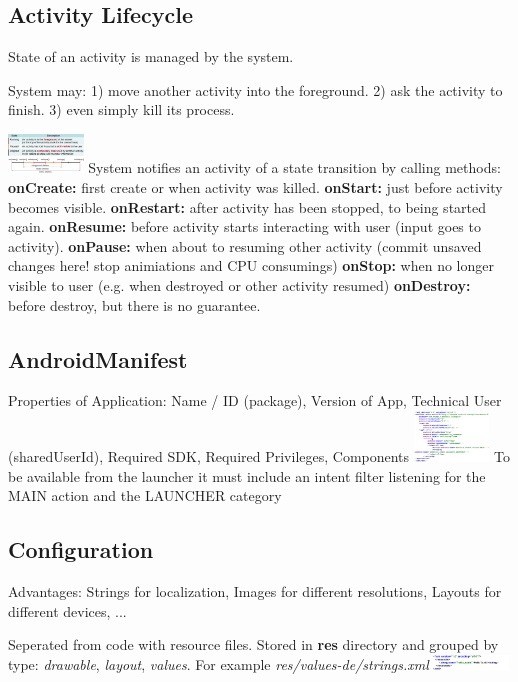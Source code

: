 \subsection{Activity Lifecycle}
State of an activity is managed by the system.

System may:
1) move another activity into the foreground.
2) ask the activity to finish.
3) even simply kill its process.

\includegraphics[width=0.15\textwidth]{android/activity_states.png}
System notifies an activity of a state transition by calling methods:
\textbf{onCreate:} first create or when activity was killed.
\textbf{onStart:} just before activity becomes visible.
\textbf{onRestart:} after activity has been stopped, to being started again.
\textbf{onResume:} before activity starts interacting with user (input goes to activity).
\textbf{onPause:} when about to resuming other activity (commit unsaved changes
here! stop animiations and CPU consumings)
\textbf{onStop:} when no longer visible to user (e.g. when destroyed or other activity resumed)
\textbf{onDestroy:} before destroy, but there is no guarantee.


\subsection{AndroidManifest}
Properties of Application: Name / ID (package), Version of App, Technical User
(sharedUserId), Required SDK, Required Privileges, Components
\includegraphics[width=0.15\textwidth]{android/manifest.png}
To be available from the launcher it must include an intent filter listening
for the MAIN action and the LAUNCHER category

\subsection{Configuration}
Advantages: Strings for localization, Images for different resolutions, Layouts for
different devices, ...

Seperated from code with resource files. Stored in \textbf{res} directory and
grouped by type: \textit{drawable}, \textit{layout}, \textit{values}. For
example \textit{res/values-de/strings.xml}
\includegraphics[width=0.15\textwidth]{android/example_resource.png}

